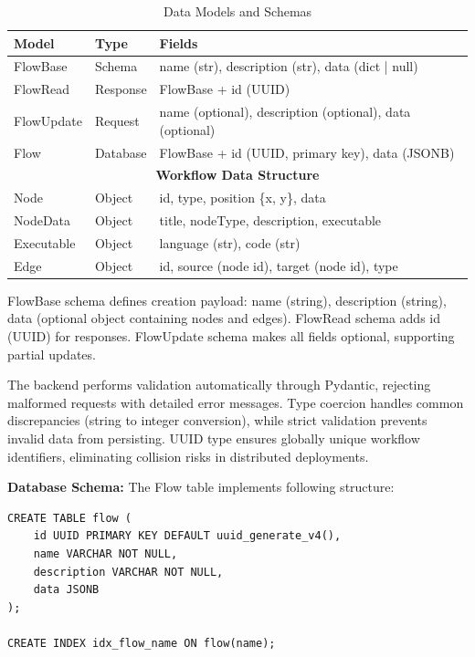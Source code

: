 \documentclass[12pt]{article}
\begin{document}
\begin{table}[h]
\centering
\caption{Data Models and Schemas}
\label{tab:data_models}
\begin{tabular}{|l|l|p{6cm}|}
\hline
\textbf{Model} & \textbf{Type} & \textbf{Fields} \\
\hline
FlowBase & Schema & name (str), description (str), data (dict | null) \\
FlowRead & Response & FlowBase + id (UUID) \\
FlowUpdate & Request & name (optional), description (optional), data (optional) \\
Flow & Database & FlowBase + id (UUID, primary key), data (JSONB) \\
\hline
\multicolumn{3}{|c|}{\textbf{Workflow Data Structure}} \\
\hline
Node & Object & id, type, position \{x, y\}, data \\
NodeData & Object & title, nodeType, description, executable \\
Executable & Object & language (str), code (str) \\
Edge & Object & id, source (node id), target (node id), type \\
\hline
\end{tabular}
\end{table}

FlowBase schema defines creation payload: name (string), description (string), data (optional object containing nodes and edges). FlowRead schema adds id (UUID) for responses. FlowUpdate schema makes all fields optional, supporting partial updates.

The backend performs validation automatically through Pydantic, rejecting malformed requests with detailed error messages. Type coercion handles common discrepancies (string to integer conversion), while strict validation prevents invalid data from persisting. UUID type ensures globally unique workflow identifiers, eliminating collision risks in distributed deployments.

\hspace{\parindent}\textbf{Database Schema:} The Flow table implements following structure:

\begin{verbatim}
CREATE TABLE flow (
    id UUID PRIMARY KEY DEFAULT uuid_generate_v4(),
    name VARCHAR NOT NULL,
    description VARCHAR NOT NULL,
    data JSONB
);

CREATE INDEX idx_flow_name ON flow(name);
\end{verbatim}
\end{document}
